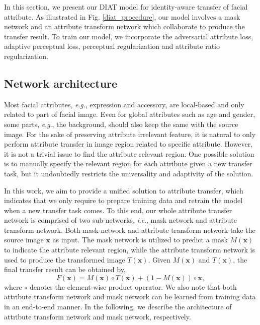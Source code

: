 \documentclass[journal]{IEEEtran}
\newcommand{\ie}{\textit{i}.\textit{e}.}
\newcommand{\eg}{\textit{e}.\textit{g}.}
\begin{document}
In this section, we present our DIAT model for identity-aware transfer of facial attribute.
As illustrated in Fig. \ref{diat_procedure}, our model involves a mask network and an attribute transform network which collaborate to produce the transfer result.
To train our model, we incorporate the adversarial attribute loss, adaptive perceptual loss, perceptual regularization and attribute ratio regularization.






\subsection{Network architecture}\label{s2_1}

Most facial attributes, \eg, expression and accessory, are local-based and only related to part of facial image.
Even for global attributes such as age and gender, some parts, \eg, the background, should also keep the same with the source image.
For the sake of preserving attribute irrelevant feature, it is natural to only perform attribute transfer in image region related to specific attribute.
However, it is not a trivial issue to find the attribute relevant region.
One possible solution is to manually specify the relevant region for each attribute given a new transfer task, but it undoubtedly restricts the universality and adaptivity of the solution.



In this work, we aim to provide a unified solution to attribute transfer, which indicates that we only require to prepare training data and retrain the model when a new transfer task comes.
To this end, our whole attribute transfer network is comprised of two sub-networks, \ie, mask network and attribute transform network.
Both mask network and attribute transform network take the source image $\mathbf{x}$ as input.
The mask network is utilized to predict a mask $M(\mathbf{x})$ to indicate the attribute relevant region, while the attribute transform network is used to produce the transformed image $T(\mathbf{x})$.
Given $M(\mathbf{x})$ and $T(\mathbf{x})$, the final transfer result can be obtained by,
\begin{equation}
\label{eqn:transfer}
F(\mathbf{x})=M(\mathbf{x}) \circ T(\mathbf{x})+(1-M(\mathbf{x})) \circ \mathbf{x},
\end{equation}
where $\circ$ denotes the element-wise product operator.
We also note that both attribute transform network and mask network can be learned from training data in an end-to-end manner.
In the following, we describe the architecture of attribute transform network and mask network, respectively.
\end{document}
